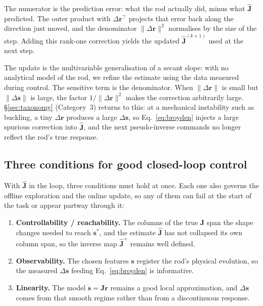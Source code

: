 \documentclass[11pt,a4paper]{article}
\begin{document}
\begin{intuition}
The numerator is the prediction error: what the rod actually did, minus what $\hat{\mathbf{J}}$
predicted. The outer product with $\Delta\mathbf{r}^{\top}$ projects that error back along the
direction just moved, and the denominator $\|\Delta\mathbf{r}\|^{2}$ normalises by the size of the
step. Adding this rank-one correction yields the updated $\hat{\mathbf{J}}^{(k+1)}$ used at the next
step.

\smallskip
\noindent The update is the multivariable generalisation of a secant slope: with no
analytical model of the rod, we refine the estimate using the data measured during
control. The sensitive term is the denominator. When $\|\Delta\mathbf{r}\|$ is small but
$\|\Delta\mathbf{s}\|$ is large, the factor $1/\|\Delta\mathbf{r}\|^2$ makes the correction arbitrarily
large. \S\ref{sec:taxonomy} (Category~3) returns to this: at a mechanical instability such
as buckling, a tiny $\Delta\mathbf{r}$ produces a large $\Delta\mathbf{s}$, so Eq.~\eqref{eq:broyden}
injects a large spurious correction into $\hat{\mathbf{J}}$, and the next pseudo-inverse commands no
longer reflect the rod's true response.
\end{intuition}

\subsection{Three conditions for good closed-loop control}

With $\hat{\mathbf{J}}$ in the loop, three conditions must hold at once. Each one also governs the
offline exploration and the online update, so any of them can fail at the start of the task
or appear partway through it:

\begin{enumerate}
    \item \textbf{Controllability / reachability.} The columns of the true $\mathbf{J}$ span the
    shape changes needed to reach $\mathbf{s}^{*}$, and the estimate $\hat{\mathbf{J}}$ has not collapsed its
    own column span, so the inverse map $\hat{\mathbf{J}}^{+}$ remains well defined.
    \item \textbf{Observability.} The chosen features $\mathbf{s}$ register the rod's physical
    evolution, so the measured $\Delta\mathbf{s}$ feeding Eq.~\eqref{eq:broyden} is informative.
    \item \textbf{Linearity.} The model $\dot{\mathbf{s}} = \mathbf{J}\dot{\mathbf{r}}$ remains a good local
    approximation, and $\Delta\mathbf{s}$ comes from that smooth regime rather than from a
    discontinuous response.
\end{enumerate}
\end{document}
